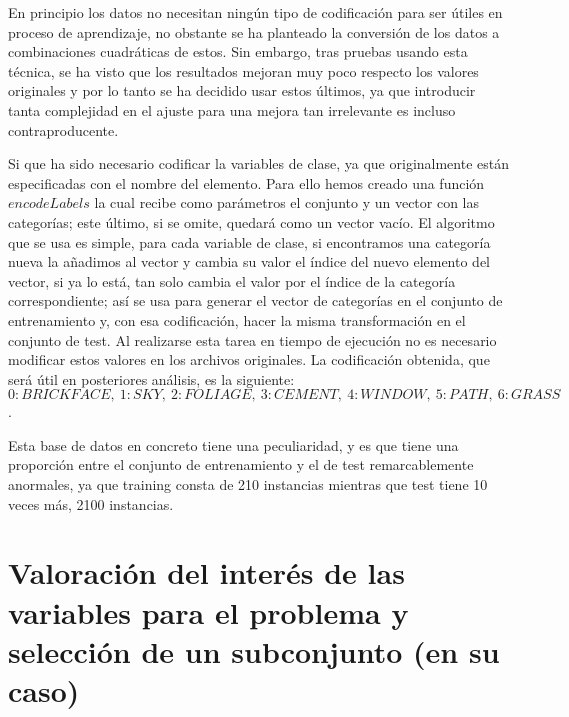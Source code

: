 \documentclass{article}
\begin{document}
	En principio los datos no necesitan ningún tipo de codificación para ser útiles en proceso de aprendizaje, no obstante se ha planteado la conversión de los datos a combinaciones cuadráticas de estos. Sin embargo, tras pruebas usando esta técnica, se ha visto que los resultados mejoran muy poco respecto los valores originales y por lo tanto se ha decidido usar estos últimos, ya que introducir tanta complejidad en el ajuste para una mejora tan irrelevante es incluso contraproducente.
	\par
	Si que ha sido necesario codificar la variables de clase, ya que originalmente están especificadas con el nombre del elemento. Para ello hemos creado una función $encodeLabels$ la cual recibe como parámetros el conjunto y un vector con las categorías; este último, si se omite, quedará como un vector vacío. El algoritmo que se usa es simple, para cada variable de clase, si encontramos una categoría nueva la añadimos al vector y cambia su valor el índice del nuevo elemento del vector, si ya lo está, tan solo cambia el valor por el índice de la categoría correspondiente; así se usa para generar el vector de categorías en el conjunto de entrenamiento y, con esa codificación, hacer la misma transformación en el conjunto de test. Al realizarse esta tarea en tiempo de ejecución no es necesario modificar estos valores en los archivos originales. La codificación obtenida, que será útil en posteriores análisis, es la siguiente: $0:BRICKFACE,\ 1:SKY,\ 2:FOLIAGE,\ 3:CEMENT,\ 4:WINDOW,\ 5:PATH,\ 6:GRASS$.
	\par
	Esta base de datos en concreto tiene una peculiaridad, y es que tiene una proporción entre el conjunto de entrenamiento y el de test remarcablemente anormales, ya que training consta de 210 instancias mientras que test tiene 10 veces más, 2100 instancias. 
	
	\section{Valoración del interés de las variables para el problema y selección de un subconjunto (en su caso)}
	
\end{document}
